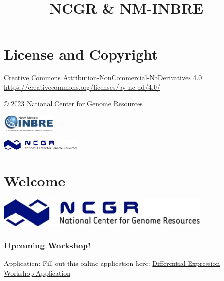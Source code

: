 \documentclass[
]{book}
\title{NCGR \& NM-INBRE}
\author{}
\date{\vspace{-2.5em}}
\begin{document}
\maketitle

{
\setcounter{tocdepth}{1}
\tableofcontents
}
\hypertarget{license-and-copyright}{%
\chapter*{License and Copyright}\label{license-and-copyright}}

Creative Commons Attribution-NonCommercial-NoDerivatives 4.0
\url{https://creativecommons.org/licenses/by-nc-nd/4.0/}

© 2023 National Center for Genome Resources

\includegraphics[width=0.2\textwidth,height=\textheight]{./Figures/INBRE_Logo_Grad_transparent-2019.png}

\includegraphics[width=0.3\textwidth,height=\textheight]{./Figures/ncgr.png}

\hypertarget{welcome}{%
\chapter*{Welcome}\label{welcome}}

\includegraphics[width=0.8\textwidth,height=\textheight]{./Figures/ncgr.png}

\hypertarget{upcoming-workshop}{%
\subsection*{Upcoming Workshop!}\label{upcoming-workshop}}

Application: Fill out this online application here:
\href{https://docs.google.com/forms/d/e/1FAIpQLScpoKxE0yAnCK3yOl5hBde7MtOWCOeXYxvjBfWyDcA9hHDGrw/viewform}{Differential Expression Workshop Application}
\end{document}
